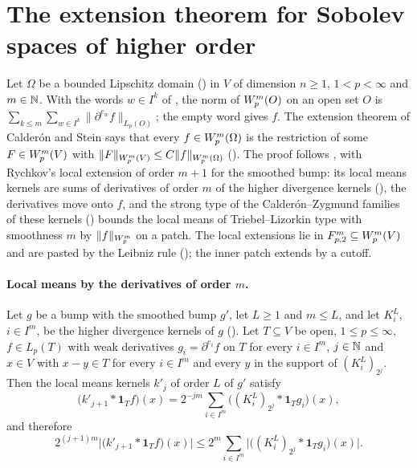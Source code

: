 \section{The extension theorem for Sobolev spaces of higher order}
\label{sec:higher-sobolev-extension}

Let $\Omega$ be a bounded Lipschitz domain () in $V$ of dimension
$n \geq 1$, $1 < p < \infty$ and $m \in \mathbb{N}$. With the words $w \in I^k$ of
, the norm of $W^{m}_{p}(O)$ on an open set $O$ is
$\sum_{k \leq m} \sum_{w \in I^k} \|\partial^{e_w} f\|_{L_p(O)}$; the empty word gives $f$. The
extension theorem of Calder\'on and Stein \cite[Chapter VI]{SteinSingular} says that every
$f \in W^{m}_{p}(\Omega)$ is the restriction of some $F \in W^{m}_{p}(V)$ with
$\|F\|_{W^{m}_{p}(V)} \leq C \|f\|_{W^{m}_{p}(\Omega)}$ ().
The proof follows , with Rychkov's local extension \cite{Rychkov} of
order $m + 1$ for the smoothed bump: its local means kernels are sums of derivatives of order $m$
of the higher divergence kernels (), the derivatives move onto
$f$, and the strong type of the Calder\'on--Zygmund families of these kernels
() bounds the local means of Triebel--Lizorkin type with
smoothness $m$ by $\|f\|_{W^{m}_{p}}$ on a patch. The local extensions lie in
$F^{m}_{p,2} \subseteq W^{m}_{p}(V)$ and are pasted by the Leibniz rule
(); the inner patch extends by a cutoff.

\paragraph{Local means by the derivatives of order $m$.}

\begin{lemma}
\label{lem:local-means-higher-point}
\leanok
{}
Let $g$ be a bump with the smoothed bump $g'$, let $L \geq 1$ and $m \leq L$, and let $K^L_i$,
$i \in I^m$, be the higher divergence kernels of $g$ (). Let
$T \subseteq V$ be open, $1 \leq p \leq \infty$,
$f \in L_p(T)$ with weak derivatives $g_i = \partial^{e_i} f$ on $T$ for every $i \in I^m$,
$j \in \mathbb{N}$ and $x \in V$ with $x - y \in T$ for every $i \in I^m$ and every $y$ in the support
of $(K^L_i)_{2^j}$. Then the local means kernels $k'_j$ of order $L$ of $g'$ satisfy
\[
  \bigl(k'_{j+1} * \mathbf 1_T f\bigr)(x) = 2^{-jm} \sum_{i \in I^m}
  \bigl((K^L_i)_{2^j} * \mathbf 1_T g_i\bigr)(x) ,
\]
and therefore
\[
  2^{(j+1)m} \bigl|\bigl(k'_{j+1} * \mathbf 1_T f\bigr)(x)\bigr| \leq 2^m \sum_{i \in I^m}
  \bigl|\bigl((K^L_i)_{2^j} * \mathbf 1_T g_i\bigr)(x)\bigr| .
\]
\end{lemma}

